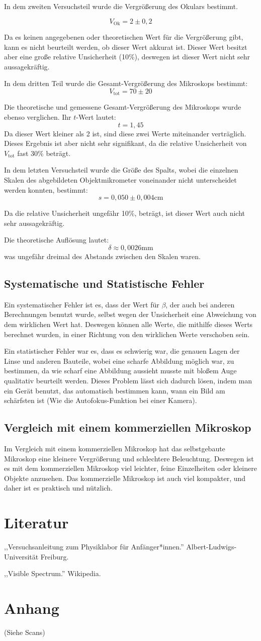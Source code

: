 \documentclass[11pt,a4paper]{article}
\begin{document}
In dem zweiten Versuchsteil wurde die Vergrößerung des Okulars bestimmt. 

$$V_\textrm{Ok} = 2 \pm 0,2$$

Da es keinen angegebenen oder theoretischen Wert für die Vergrößerung gibt, kann es nicht beurteilt werden, ob dieser Wert akkurat ist. Dieser Wert besitzt aber eine große relative Unsicherheit (10\%), deswegen ist dieser Wert nicht sehr aussagekräftig. 

In dem dritten Teil wurde die Gesamt-Vergrößerung des Mikroskops bestimmt:
$$V_\textrm{tot} = 70 \pm 20$$

Die theoretische und gemessene Gesamt-Vergrößerung des Mikroskops wurde ebenso verglichen. Ihr $t$-Wert lautet:
$$t = 1,45 $$
Da dieser Wert kleiner als 2 ist, sind diese zwei Werte miteinander verträglich. Dieses Ergebnis ist aber nicht sehr signifikant, da die relative Unsicherheit von $V_\textrm{tot}$ fast 30\% beträgt.

In dem letzten Versuchsteil wurde die Größe des Spalts, wobei die einzelnen Skalen des abgebildeten Objektmikrometer voneinander nicht unterscheidet werden konnten, bestimmt:
$$s = 0,050 \pm 0,004 \textrm{cm}$$

Da die relative Unsicherheit ungefähr 10\%, beträgt, ist dieser Wert auch nicht sehr aussagekräftig. 

Die theoretische Auflösung lautet:
$$\delta \approx 0,0026 \textrm{mm}$$
was ungefähr dreimal des Abstands zwischen den Skalen waren. 
\subsection{Systematische und Statistische Fehler}
Ein systematischer Fehler ist es, dass der Wert für $\beta$, der auch bei anderen Berechnungen benutzt wurde, selbst wegen der Unsicherheit eine Abweichung von dem wirklichen Wert hat. Deswegen können alle Werte, die mithilfe dieses Werts berechnet wurden, in einer Richtung von den wirklichen Werte verschoben sein. 

Ein statistischer Fehler war es, dass es schwierig war, die genauen Lagen der Linse und anderen Bauteile, wobei eine scharfe Abbildung möglich war, zu bestimmen, da wie scharf eine Abbildung aussieht musste mit bloßem Auge qualitativ beurteilt werden. Dieses Problem lässt sich dadurch lösen, indem man ein Gerät benutzt, das automatisch bestimmen kann, wann ein Bild am schärfsten ist (Wie die Autofokus-Funktion bei einer Kamera). 
\subsection{Vergleich mit einem kommerziellen Mikroskop}
Im Vergleich mit einem kommerziellen Mikroskop hat das selbstgebaute Mikroskop eine kleinere Vergrößerung und schlechtere Beleuchtung. Deswegen ist es mit dem kommerziellen Mikroskop viel leichter, feine Einzelheiten oder kleinere Objekte anzusehen. Das kommerzielle Mikroskop ist auch viel kompakter, und daher ist es praktisch und nützlich. 


\section{Literatur}
,,Versuchsanleitung zum Physiklabor für Anfänger*innen.'' Albert-Ludwigs-Universität Freiburg. 

,,Visible Spectrum.'' Wikipedia. 
\section{Anhang}
(Siehe Scans)
\end{document}
